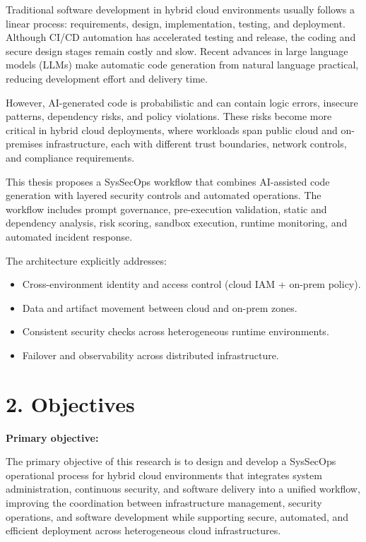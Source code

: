 Traditional software development in hybrid cloud environments usually follows a linear process:
requirements, design, implementation, testing, and deployment. Although CI/CD automation has
accelerated testing and release, the coding and secure design stages remain costly and slow. Recent
advances in large language models (LLMs) make automatic code generation from natural language
practical, reducing development effort and delivery time.

However, AI-generated code is probabilistic and can contain logic errors, insecure patterns,
dependency risks, and policy violations. These risks become more critical in hybrid cloud
deployments, where workloads span public cloud and on-premises infrastructure, each with different
trust boundaries, network controls, and compliance requirements.

This thesis proposes a SysSecOps workflow that combines AI-assisted code generation with layered
security controls and automated operations. The workflow includes prompt governance, pre-execution
validation, static and dependency analysis, risk scoring, sandbox execution, runtime monitoring, and
automated incident response.

The architecture explicitly addresses:
\begin{itemize}
    \item Cross-environment identity and access control (cloud IAM + on-prem policy).
    \item Data and artifact movement between cloud and on-prem zones.
    \item Consistent security checks across heterogeneous runtime environments.
    \item Failover and observability across distributed infrastructure.
\end{itemize}

\section*{2. Objectives}

\textbf{Primary objective:}

The primary objective of this research is to design and develop a SysSecOps operational process for
hybrid cloud environments that integrates system administration, continuous security, and software
delivery into a unified workflow, improving the coordination between infrastructure management,
security operations, and software development while supporting secure, automated, and efficient
deployment across heterogeneous cloud infrastructures.

